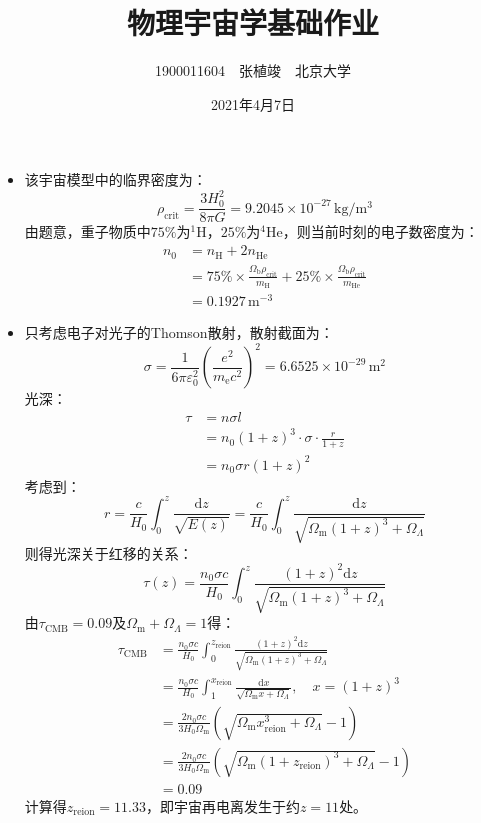 \documentclass[a4paper,fontset=none]{ctexart}
\begin{document}
\title{\textbf{物理宇宙学基础作业}}
\author{1900011604\ \ 张植竣\ \ 北京大学}
\date{2021年4月7日}
\maketitle

\begin{itemize}
    \item[1.(a)]
    该宇宙模型中的临界密度为：
    \[
    \rho_\mathrm{crit} = \frac{3H_0^2}{8\pi G} = 9.2045\times10^{-27}\,\mathrm{kg/m^3}
    \]
    由题意，重子物质中$75\%$为$^1\mathrm{H}$，$25\%$为$^4\mathrm{He}$，则当前时刻的电子数密度为：
    \begin{align*}
    n_0
    &= n_\mathrm{H} + 2n_\mathrm{He} \\
    &= 75\%\times\frac{\Omega_\mathrm{b}\rho_\mathrm{crit}}{m_\mathrm{H}} + 25\%\times\frac{\Omega_\mathrm{b}\rho_\mathrm{crit}}{m_\mathrm{He}} \\
    &= 0.1927\,\mathrm{m^{-3}}
    \end{align*}

    \item[1.(b)]
    只考虑电子对光子的Thomson散射，散射截面为：
    \[
    \sigma = \frac{1}{6\pi\varepsilon_0^2}\left(\frac{e^2}{m_\mathrm{e}c^2}\right)^2 = 6.6525\times10^{-29}\,\mathrm{m^2}
    \]
    光深：
    \begin{align*}
    \tau
    &= n\sigma l \\
    &= n_0(1+z)^3 \cdot \sigma \cdot \frac{r}{1+z} \\
    &= n_0\sigma r(1+z)^2
    \end{align*}
    考虑到：
    \[
    r = \frac{c}{H_0}\int_{0}^{z}\frac{\mathrm{d}z}{\sqrt{E(z)}} = \frac{c}{H_0}\int_{0}^{z}\frac{\mathrm{d}z}{\sqrt{\Omega_\mathrm{m}(1+z)^3 + \Omega_\Lambda}}
    \]
    则得光深关于红移的关系：
    \[
    \tau(z) = \frac{n_0\sigma c}{H_0}\int_{0}^{z}\frac{(1+z)^2\mathrm{d}z}{\sqrt{\Omega_\mathrm{m}(1+z)^3 + \Omega_\Lambda}}
    \]
    由$\tau_\mathrm{CMB}=0.09$及$\Omega_\mathrm{m}+\Omega_\Lambda=1$得：
    \begin{align*}
        \tau_\mathrm{CMB}
        &= \frac{n_0\sigma c}{H_0}\int_{0}^{z_\mathrm{reion}}\frac{(1+z)^2\mathrm{d}z}{\sqrt{\Omega_\mathrm{m}(1+z)^3 + \Omega_\Lambda}} \\
        &= \frac{n_0\sigma c}{H_0}\int_{1}^{x_\mathrm{reion}}\frac{\mathrm{d}x}{\sqrt{\Omega_\mathrm{m}x + \Omega_\Lambda}},\quad x = (1+z)^3 \\
        &= \frac{2n_0\sigma c}{3H_0\Omega_\mathrm{m}}(\sqrt{\Omega_\mathrm{m}x_\mathrm{reion}^3 + \Omega_\Lambda} - 1) \\
        &= \frac{2n_0\sigma c}{3H_0\Omega_\mathrm{m}}(\sqrt{\Omega_\mathrm{m}(1+z_\mathrm{reion})^3 + \Omega_\Lambda} - 1) \\
        &= 0.09
    \end{align*}
    计算得$z_\mathrm{reion}=11.33$，即宇宙再电离发生于约$z=11$处。
    

\end{itemize}
\end{document}
